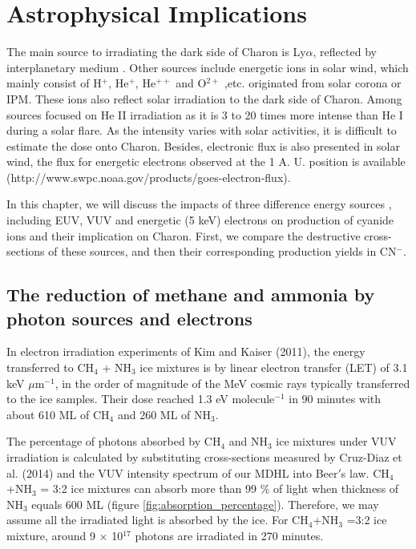 \chapter{\protect Astrophysical Implications}
\label{astron}

The main source to irradiating the dark side of Charon is Ly$\alpha$, reflected by interplanetary medium \cite{grundy2016formation}. Other sources include energetic ions in solar wind, which mainly consist of H$^+$, He$^+$, He$^{++}$ and O$^{2+}$ ,etc. originated from solar corona or IPM. These ions also reflect solar irradiation to the dark side of Charon. Among sources focused on He II irradiation as it is 3 to 20 times more intense than He I during a solar flare. As the intensity varies with solar activities, it is difficult to estimate the dose onto Charon. Besides, electronic flux is also presented in solar wind, the flux for energetic electrons observed at the 1 A. U. position is available (http://www.swpc.noaa.gov/products/goes-electron-flux).

In this chapter, we will discuss the impacts of three difference energy sources , including EUV, VUV and energetic (5 keV) electrons on production of cyanide ions and their implication on Charon. First, we compare the destructive cross-sections of these sources, and then their corresponding production yields in CN$^-$. 
\section{The reduction of methane and ammonia by photon sources and electrons}

In electron irradiation experiments of Kim and Kaiser (2011)\cite{kim}, the energy transferred to CH$_4$ + NH$_3$ ice mixtures is by linear electron transfer (LET) of 3.1 keV $\mu$m$^{-1}$, in the order of magnitude of the MeV cosmic rays typically transferred to the ice samples. Their dose reached 1.3 eV molecule$^{-1}$ in 90 minutes with about 610 ML of CH$_4$ and 260 ML of NH$_3$. 

The percentage of photons absorbed by CH$_4$ and NH$_3$ ice mixtures under VUV irradiation is calculated by substituting cross-sections measured by Cruz-Diaz et al. (2014) \cite{cruz2014vacuum} and the VUV intensity spectrum of our MDHL into Beer$'$s law. CH$_4$+NH$_3$ = 3:2 ice mixtures can absorb more than 99 \% of light when thickness of NH$_3$ equals 600 ML (figure \ref{fig:absorption_percentage}). Therefore, we may assume all the irradiated light is absorbed by the ice. For CH$_4$+NH$_3$ =3:2 ice mixture, around 9 $\times$ 10$^{17}$ photons are irradiated in 270 minutes.

